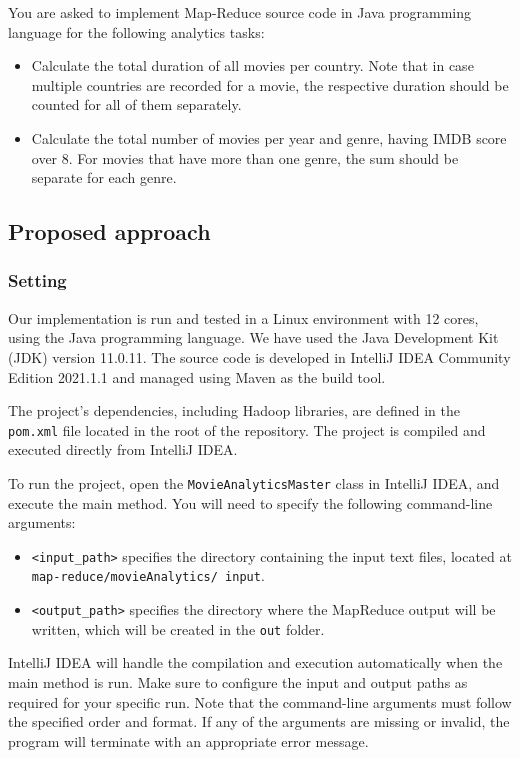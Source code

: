 \documentclass[acmlarge]{acmart}
\begin{document}
You are asked to implement Map-Reduce source code in Java programming language for the following analytics tasks:
\begin{itemize}
  \item Calculate the total duration of all movies per country. Note that in case multiple countries are recorded for a movie, the respective duration should be counted for all of them separately.
  \item Calculate the total number of movies per year and genre, having IMDB score over 8. For movies that have more than one genre, the sum should be separate for each genre.
\end{itemize}

\subsection{Proposed approach}
\subsubsection{Setting}
Our implementation is run and tested in a Linux environment with 12 cores, using the Java programming language.
We have used the Java Development Kit (JDK) version 11.0.11.
The source code is developed in IntelliJ IDEA Community Edition 2021.1.1 and managed using Maven as the build tool.

The project’s dependencies, including Hadoop libraries, are defined in the \texttt{pom.xml} file located in the root of
the repository.
The project is compiled and executed directly from IntelliJ IDEA.

To run the project, open the \texttt{MovieAnalyticsMaster} class in IntelliJ IDEA, and execute the main method.
You will need to specify the following command-line arguments:

\begin{itemize}
  \item \texttt{<input\_path>} specifies the directory containing the input text files, located at \texttt{map-reduce/movieAnalytics/ input}.
  \item \texttt{<output\_path>} specifies the directory where the MapReduce output will be written, which will be created in the \texttt{out} folder.
\end{itemize}

IntelliJ IDEA will handle the compilation and execution automatically when the main method is run. Make sure to configure the input and output paths as required for your specific run. Note that the command-line arguments must follow the specified order and format. If any of the arguments are missing or invalid, the program will terminate with an appropriate error message.
\end{document}
